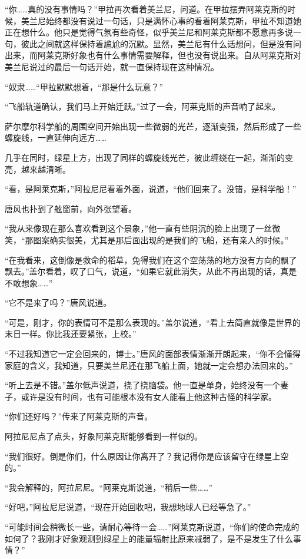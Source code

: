 “你……真的没有事情吗？”甲拉再次看着美兰尼，问道。在甲拉摆弄阿莱克斯的时候，美兰尼始终都没有说过一句话，只是满怀心事的看着阿莱克斯，甲拉不知道她正在想什么。他只是觉得气氛有些奇怪，似乎美兰尼和阿莱克斯都不愿意再多说一句，彼此之间就这样保持着尴尬的沉默。显然，美兰尼有什么话想问，但是没有问出来，而阿莱克斯好象也有什么事情需要解释，但也没有说出来。自从阿莱克斯对美兰尼说过的最后一句话开始，就一直保持现在这种情况。 

“奴隶……“甲拉默默想着，“那是什么玩意？” 

“飞船轨道确认，我们马上开始迁跃。”过了一会，阿莱克斯的声音响了起来。 

萨尔摩尔科学船的周围空间开始出现一些微弱的光芒，逐渐变强，然后形成了一些螺旋线，一直延伸向远方…… 

几乎在同时，绿星上方，出现了同样的螺旋线光芒，彼此缠绕在一起，渐渐的变亮，越来越清晰。 

“看，是阿莱克斯，”阿拉尼尼看着外面，说道，“他们回来了。没错，是科学船！” 

唐风也扑到了舷窗前，向外张望着。 

“我从来像现在那么喜欢看到这个景象，”他一直有些阴沉的脸上出现了一丝微笑，“那图案确实很美，尤其是那后面出现的是我们的飞船，还有亲人的时候。” 

“在我看来，这倒像是救命的稻草，免得我们在这个空荡荡的地方没有方向的飘了飘去。”盖尔看着，叹了口气，说道，“如果它就此消失，从此不再出现的话，真是不敢想象……” 

“它不是来了吗？”唐风说道。 

“可是，刚才，你的表情可不是那么表现的。”盖尔说道，“看上去简直就像是世界的末日一样。你比我还要紧张，上校。” 

“不过我知道它一定会回来的，博士。”唐风的面部表情渐渐开朗起来，“你不会懂得家庭的含义，我知道，只要美兰尼还在那飞船上面，她就一定会想办法回来的。” 

“听上去是不错。”盖尔低声说道，挠了挠脑袋。他一直是单身，始终没有一个妻子，或许是没有时间，也有可能根本没有女人能看上他这种古怪的科学家。 

“你们还好吗？”传来了阿莱克斯的声音。 

阿拉尼尼点了点头，好象阿莱克斯能够看到一样似的。 

“我们很好。倒是你们，什么原因让你离开了？我记得你是应该留守在绿星上空的。” 

“我会解释的，阿拉尼尼。“阿莱克斯说道，“稍后一些……” 

“好吧，”阿拉尼尼说道，“现在开始回收吧，我想地球人已经等急了。” 

“可能时间会稍微长一些，请耐心等待一会……”阿莱克斯说道，“你们的使命完成的如何了？我刚才好象观测到绿星上的能量辐射比原来减弱了，是不是发生了什么事情？” 

